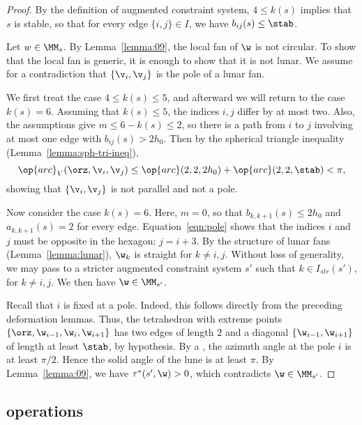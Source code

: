 \begin{proof}
By the definition of augmented constraint system, $4\le k(s)$ implies
that $s$ is stable, so that for every edge $\{i,j\}\in I$, we have
$b_{i j}(s) \le\stab$.

Let $w\in \MM_s$.  By Lemma~\ref{lemma:09}, the local fan of $\w$  is not circular.
To show that the local fan is generic, it is enough to show that it is not lunar.
We assume for a contradiction that $\{\v_i,\v_j\}$ is the pole of a lunar fan.

We first treat the case  $4\le k(s)\le 5$,
and afterward we will return to the case $k(s)=6$. 
Assuming that  $k(s)\le 5$, the indices $i,j$ differ by at most two.
Also, the assumptions give $m\le 6-k(s)\le 2$, so there is a path from
$i$ to $j$ involving at most one edge with $b_{i j}(s)>2h_0$.
Then by the spherical triangle inequality (Lemma~\ref{lemma:sph-tri-ineq}),
\begin{equation}\label{eqn:pole}
\op{arc}_V(\orz,\v_i,\v_j) \le \op{arc}(2,2,2h_0) + \op{arc}(2,2,\stab) < \pi,
\end{equation}
showing that $\{\v_i,\v_j\}$ is not parallel and not a pole.

Now consider the case $k(s)=6$.  Here, $m=0$, so that $b_{k,k+1}(s)\le 2h_0$
and $a_{k,k+1}(s)=2$
for every edge. Equation~\ref{eqn:pole} shows that the indices $i$ and $j$
must be opposite in the hexagon: $j = i+3$.  By the structure of lunar fans
(Lemma~\ref{lemma:lunar}), $\w_k$ is straight for $k\ne i,j$.  Without
loss of generality, we may
pass to a stricter augmented constraint system $s'$ such that
$k\in I_{str}(s')$, for $k\ne i,j$.  We then have $\w\in \MM_{s'}$.

Recall that $i$ is fixed at a pole. 
  Indeed, this follows directly from the preceding deformation
lemmas.  Thus, the tetrahedron with extreme points
$\{\orz,\w_{i-1},\w_i,\w_{i+1}\}$ has two edges
of length $2$ and a diagonal $\{\w_{i-1},\w_{i+1}\}$ of length at least
$\stab$, by hypothesis.  By a , 
the azimuth angle at the pole $i$ is at least $\pi/2$.
Hence the solid angle of the lune is at least $\pi$.  By Lemma~\ref{lemma:09},
we have $\tau^*(s',\w)>0$, which contradicts $\w\in \MM_{s'}$.
\end{proof}



\subsection{operations}

